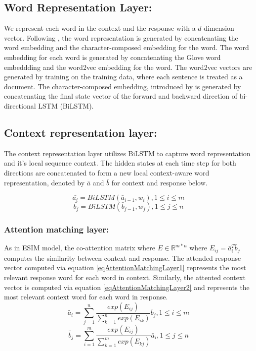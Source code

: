 \documentclass[letterpaper]{article} %
\begin{document}
\subsection{Word Representation Layer:}
We represent each word in the context and the response with a $d$-dimension vector. Following \citeauthor{dong2018enhance} , the word representation is generated by concatenating the word embedding and the character-composed embedding for the word.  The word embedding for each word is generated by concatenating the Glove word embeddding \cite{pennington2014glove} and the word2vec embedding \cite{mikolov2013efficient} for the word. The word2vec vectors are generated by training on the training data, where each sentence is treated as a document. The character-composed embedding, introduced by \cite{dong2018enhance} is generated by concatenating the final state vector of the forward and backward direction of bi-directional LSTM (BiLSTM).

\subsection{Context representation layer:}
The context representation layer utilizes BiLSTM to capture word representation and it's local sequence context. The hidden states at each time step for both directions are concatenated to form a new local context-aware word representation, denoted by $\bar{a}$ and $\bar{b}$ for context and response
below.

\begin{equation}
\label{eqContextRepresentationLayer1}
\bar{a_i} = BiLSTM(\bar{a}_{i-1}, w_i), 1 \leq i \leq m
\end{equation}
\begin{equation}
\label{eqContextRepresentationLayer2}
\bar{b_j} = BiLSTM(\bar{b}_{j-1}, w_j), 1 \leq j \leq n
\end{equation}

\subsubsection{Attention matching layer:}
As in ESIM model, the co-attention matrix where $E \in \mathbb{R}^{m*n}$ where $E_{ij} =\bar{a}_i^T\bar{b}_j$ computes the similarity between context and response. The attended response vector computed via equation \ref{eqAttentionMatchingLayer1} represents the most relevant response word for each word in context. Similarly, the attented context vector is computed via equation \ref{eqAttentionMatchingLayer2} and represents the most relevant context word for each word in response.
\begin{equation}
\label{eqAttentionMatchingLayer1}
\tilde{a_i} = \sum_{j=1}^n \frac{exp(E_{ij})}{\sum_{k=1}^n exp(E_{ik})}\bar{b}_j, 1 \leq i \leq m
\end{equation}
\begin{equation}
\label{eqAttentionMatchingLayer2}
\tilde{b_j} = \sum_{i=1}^m \frac{exp(E_{ij})}{\sum_{k=1}^m exp(E_{kj})}\bar{a}_i, 1 \leq j \leq n
\end{equation}
\end{document}
